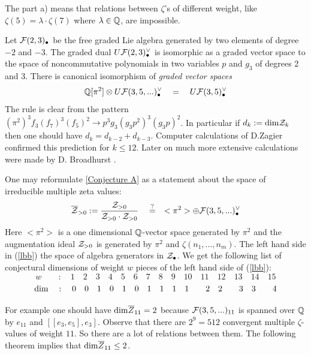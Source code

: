 \documentclass[10pt]{article}
\begin{document}
The part a) means that relations between $\zeta$'s of different weight, like $\zeta(5) = 
\lambda \cdot \zeta(7)$ where $\lambda \in {\mathbb Q}$, are impossible.

Let ${\cal F}(2,3)_{\bullet}$ be the free graded Lie algebra generated by two 
elements of degree $-2$ and $-3$.  The graded dual $U{\cal F}(2,3)_{\bullet}^{\vee}$ 
is isomorphic as a
graded vector space  to the space of noncommutative
polynomials in two variables $p$ and $g_3$ of degrees 2 and 3.
There is canonical isomorphism of {\it graded vector spaces}
$$
{\mathbb Q}[\pi^2] \otimes U{\cal F}(3,5,...
)_{\bullet}^{\vee}  \quad = \quad U{\cal F}(3,5)_{\bullet}^{\vee}
$$
The rule is clear from the pattern
$
(\pi^2)^3 f_3(f_7)^3(f_5)^2 \longrightarrow p^3 g_3(g_3p^2)^3(g_3p)^2
$. 
In particular if $d_k := {\rm dim} {\cal Z}_{k}$ then one should have $d_k =
d_{k-2} + d_{k-3}$. Computer calculations of D.Zagier \cite{Z} confirmed this prediction 
for $k\leq 12$. Later on  much more extensive calculations  
were made by D. Broadhurst \cite{Br}.  

 
One may reformulate  \ref{Conjecture A} as a statement about the space of 
irreducible multiple zeta values:
\begin{equation} \label{lbb}
{\overline {\cal Z}}_{ >0} :=  \frac{  {\cal Z}_{>0}}{ {\cal Z }_{>0} \cdot
   {\cal Z}_{>0}} \quad \stackrel{?}{=} \quad <\pi^2> \oplus {\cal F}(3,5,...)_{\bullet}^{\vee}
\end{equation}
Here $<\pi^2>$ is a one dimensional ${\mathbb Q}$-vector space generated by $\pi^2$ and 
the augmentation ideal ${\cal Z }_{>0}$  is generated by $\pi^2$ and $\zeta(n_1, ..., n_m)$.  
The left hand side in (\ref{lbb}) the space of algebra generators in
${\cal Z }_{\bullet}$. 
We get the following list of conjectural dimensions of weight $ w$
pieces of the left hand side of (\ref{lbb}):
$$
w \qquad : \quad 1 \quad 2 \quad   3 \quad 4 \quad 5\quad 6 \quad 7 \quad 8
\quad 9 \quad 10 \quad 11 \quad 12 \quad 13 \quad 14 \quad 15
$$
$$
{\rm dim} \quad: \quad 0 \quad 0 \quad 1 \quad 0 \quad 1 \quad 0 \quad 1 \quad 1
\quad 1 \quad 1 \qquad 2 \quad 2 \qquad 3 \quad 3 \qquad 4
$$

For example  one should have   ${\rm dim} \overline Z_{ 11} = 2$
     because ${\cal F}(3,5,...)_{11}$ is spanned 
over ${\mathbb Q}$ 
by  $e_{11}$ and $[[e_{3},e_{5}],e_3]$. Observe that there are $2^9=512$ convergent multiple 
$\zeta$-values of weight $11$. So there are a lot of  relations between them. The following 
theorem implies that ${\rm dim} \overline Z_{ 11} \leq  2$.
  
\end{document}
